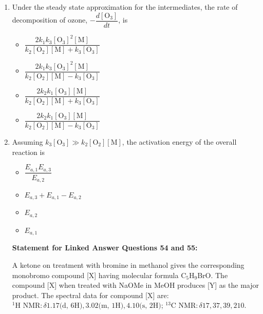 \documentclass[journal,12pt,onecolumn]{IEEEtran}
\theoremstyle{remark}
\begin{document}
\begin{enumerate}
 

\item    \hspace{0.5cm} Under the steady state approximation for the intermediates, the rate of decomposition of ozone, \( -\dfrac{d[\text{O}_3]}{dt} \), is  \hfill{}

\begin{multicols}{2}
\begin{itemize}[label=(A)]
    \item \( \dfrac{2k_1k_3[\text{O}_3]^2[\text{M}]}{k_2[\text{O}_2][\text{M}] + k_3[\text{O}_3]} \)
    \item \( \dfrac{2k_1k_3[\text{O}_3]^2[\text{M}]}{k_2[\text{O}_2][\text{M}] - k_3[\text{O}_3]} \)
    \item \( \dfrac{2k_2k_1[\text{O}_3][\text{M}]}{k_2[\text{O}_2][\text{M}] + k_3[\text{O}_3]} \)
    \item \( \dfrac{2k_2k_1[\text{O}_3][\text{M}]}{k_2[\text{O}_2][\text{M}] - k_3[\text{O}_3]} \)
\end{itemize}
\end{multicols}

 

\item    \hspace{0.5cm} Assuming \(k_3[\text{O}_3] \gg k_2[\text{O}_2][\text{M}]\), the activation energy of the overall reaction is  \hfill{}

\begin{multicols}{2}
\begin{itemize}[label=(A)]
    \item \( \dfrac{E_{a,1}E_{a,3}}{E_{a,2}} \)
    \item \( E_{a,3} + E_{a,1} - E_{a,2} \)
    \item \( E_{a,2} \)
    \item \( E_{a,1} \)
\end{itemize}
\end{multicols}

 

\noindent\textbf{Statement for Linked Answer Questions 54 and 55:}

A ketone on treatment with bromine in methanol gives the corresponding monobromo compound [X] having molecular formula C\(_5\)H\(_9\)BrO. The compound [X] when treated with NaOMe in MeOH produces [Y] as the major product. The spectral data for compound [X] are: \( ^1\text{H NMR}: \delta 1.17 \text{(d, 6H)}, 3.02 \text{(m, 1H)}, 4.10 \text{(s, 2H)} \); \(^{13}\text{C NMR}: \delta 17, 37, 39, 210 \).


\end{enumerate}
\end{document}
